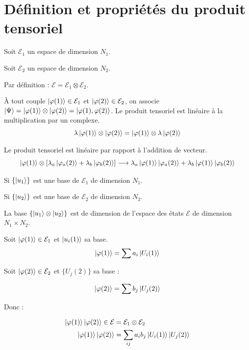 \documentclass[12pt,a4paper,titlepage]{book}
\begin{document}
\section{Définition et propriétés du produit tensoriel}

Soit $\mathcal{E}_1$ un espace de dimension $N_1$.

Soit $\mathcal{E}_2$ un espace de dimension $N_2$.

Par définition : $\mathcal{E} = \mathcal{E}_1 \otimes \mathcal{E}_2$.

À tout couple $\ket{\varphi (1)} \in \mathcal{E}_1$ et $\ket{\varphi (2)} \in \mathcal{E}_2$, on associe $\ket\Psi = \ket{\varphi (1)} \otimes \ket{\varphi (2)} = \ket{\varphi (1), \varphi (2)}$. Le produit tensoriel est linéaire à la multiplication par un complexe.
\begin{equation*}
\lambda \ket{\varphi (1)} \otimes \ket{\varphi (2)} = \ket{\varphi (1)} \otimes \lambda \ket{\varphi (2)}
\end{equation*}

Le produit tensoriel est linéaire par rapport à l'addition de vecteur.
\begin{equation*}
\ket{\varphi (1)} \otimes \left[ \lambda_a \ket{\varphi_a (2)} + \lambda_b \ket{\varphi_b (2)} \right] \longrightarrow \lambda_a \ket{\varphi (1)} \ket{\varphi_a (2)} + \lambda_b \ket{\varphi (1)} \ket{\varphi_b (2)}
\end{equation*}

Si $\lbrace \ket{u_1} \rbrace$ est une base de $\mathcal{E}_1$ de dimension $N_1$.

Si $\lbrace \ket{u_2} \rbrace$ est une base de $\mathcal{E}_2$ de dimension $N_2$.

La base $\lbrace \ket{u_1} \otimes \ket{u_2} \rbrace$ est de dimension de l'espace des états $\mathcal{E}$ de dimension $N_1 \times N_2$.

Soit $\ket{\varphi (1)} \in \mathcal{E}_1$ et $\ket{u_i (1)}$ sa base.
\begin{equation*}
\ket{\varphi (1)} = \sum a_i \ket{U_i (1)}
\end{equation*}

Soit $\ket{\varphi (2)} \in \mathcal{E}_2$ et $\lbrace U_j (2) \rbrace$ sa base :

\begin{equation*}
\ket{\varphi (2)} = \sum b_j \ket{U_j (2)}
\end{equation*}

Donc :

\begin{align*}
\ket{\varphi (1)} \ket{\varphi (2)} \in \mathcal{E} &= \mathcal{E}_1 \otimes \mathcal{E}_2\\
\ket{\varphi (1)} \ket{\varphi (2)} &= \sum\limits_{i j} a_i b_j \ket{U_i (1)} \ket{U_j (2)}
\end{align*}
\end{document}
